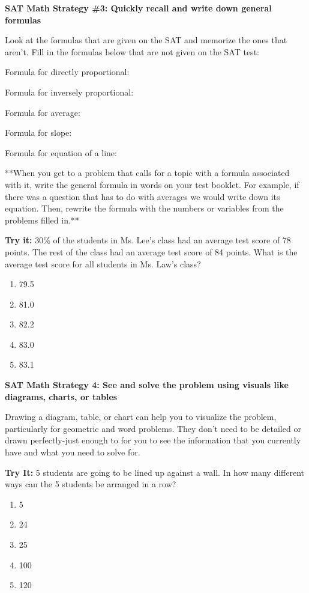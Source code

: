 \vfill
\dotfill

\bigskip
\textbf{\large\sffamily SAT Math Strategy \#3: Quickly recall and write down general formulas}

\bigskip
Look at the formulas that are given on the SAT and memorize the ones that aren't. Fill in the formulas below that are not given on the SAT test:

\bigskip
Formula for directly proportional:

\vfill
Formula for inversely proportional:

\vfill
Formula for average:

\vfill
Formula for slope:

\vfill
Formula for equation of a line:

\vfill
\newpage
**When you get to a problem that calls for a topic with a formula associated with it, write the general formula in words on your test booklet. For example, if there was a question that has to do with averages we would write down its equation. Then, rewrite the formula with the numbers or variables from the problems filled in.**

\vfill
\textbf{Try it:} 30\% of the students in Ms. Lee's class had an average test score of 78 points. The rest of the class had an average test score of 84 points. What is the average test score for all students in Ms. Law's class?

\begin{enumerate}[label=(\Alph*)]
\item 79.5
\item 81.0
\item 82.2
\item 83.0
\item 83.1
\end{enumerate}

\vfill
\dotfill

\bigskip
\textbf{\large\sffamily SAT Math Strategy 4: See and solve the problem using visuals like diagrams, charts, or tables}

\bigskip
Drawing a diagram, table, or chart can help you to visualize the problem, particularly for geometric and word problems. They don't need to be detailed or drawn perfectly-just enough to for you to see the information that you currently have and what you need to solve for.

\vfill
\textbf{Try It:} 5 students are going to be lined up against a wall. In how many different ways can the 5 students be arranged in a row?

\begin{enumerate}[label=(\Alph*)]
\item 5
\item 24
\item 25
\item 100
\item 120
\end{enumerate}